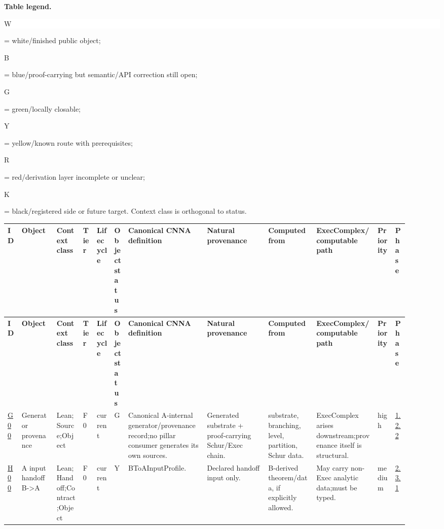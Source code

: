 \footnotesize
\par\smallskip\noindent\begin{minipage}{0.99\linewidth}\footnotesize\raggedright\textbf{Table legend.} \colorbox{white}{\strut W} = white/finished public object; \colorbox{cyan!20}{\strut B} = blue/proof-carrying but semantic/API correction still open; \colorbox{green!18}{\strut G} = green/locally closable; \colorbox{yellow!25}{\strut Y} = yellow/known route with prerequisites; \colorbox{red!20}{\strut R} = red/derivation layer incomplete or unclear; \colorbox{black!18}{\strut K} = black/registered side or future target. Context class is orthogonal to status.\end{minipage}\par\vspace{0.25em}
\begin{longtable}{L{0.022\linewidth} L{0.082\linewidth} L{0.065\linewidth} L{0.032\linewidth} L{0.042\linewidth} L{0.028\linewidth} L{0.18\linewidth} L{0.145\linewidth} L{0.115\linewidth} L{0.145\linewidth} L{0.042\linewidth} L{0.022\linewidth}}
\hline
\textbf{ID} & \textbf{Object} & \textbf{Context class} & \textbf{Tier} & \textbf{Lifecycle} & \textbf{Object status} & \textbf{Canonical CNNA definition} & \textbf{Natural provenance} & \textbf{Computed from} & \textbf{ExecComplex/\allowbreak{}computable path} & \textbf{Priority} & \textbf{Phase}\\
\hline
\endfirsthead
\hline
\textbf{ID} & \textbf{Object} & \textbf{Context class} & \textbf{Tier} & \textbf{Lifecycle} & \textbf{Object status} & \textbf{Canonical CNNA definition} & \textbf{Natural provenance} & \textbf{Computed from} & \textbf{ExecComplex/\allowbreak{}computable path} & \textbf{Priority} & \textbf{Phase}\\
\hline
\endhead
\hyperlink{object-row-G00}{G00} & Generator provenance & Lean;\newline Source;\newline Object & F0 & current & G & Canonical A-internal generator/\allowbreak{}provenance record;\newline no pillar consumer generates its own sources. & Generated substrate + proof-carrying Schur/\allowbreak{}Exec chain. & substrate, branching, level, partition, Schur data. & ExecComplex arises downstream;\newline provenance itself is structural. & high & \hyperlink{phase-row-1-2-2}{1.2.2}\\
\hline
\addlinespace[0.24em]
\hyperlink{object-row-H00}{H00} & A input handoff B->A & Lean;\newline Handoff;\newline Contract;\newline Object & F0 & current & Y & BToAInputProfile. & Declared handoff input only. & B-derived theorem/\allowbreak{}data, if explicitly allowed. & May carry non-Exec analytic data;\newline must be typed. & medium & \hyperlink{phase-row-2-3-1}{2.3.1}\\

\end{longtable}

